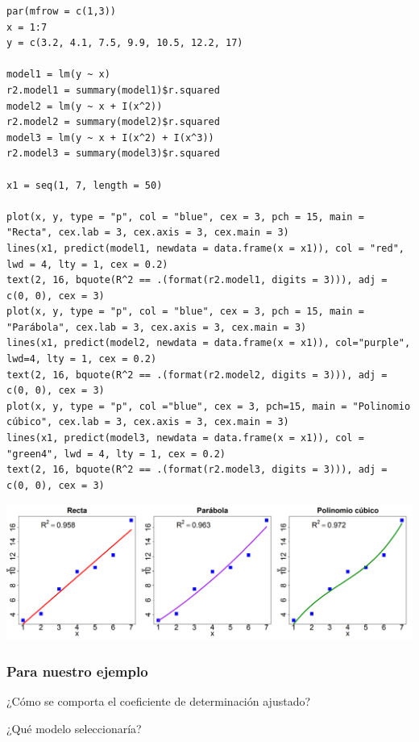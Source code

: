 \begin{lstlisting}
par(mfrow = c(1,3))
x = 1:7
y = c(3.2, 4.1, 7.5, 9.9, 10.5, 12.2, 17)

model1 = lm(y ~ x)
r2.model1 = summary(model1)$r.squared
model2 = lm(y ~ x + I(x^2))
r2.model2 = summary(model2)$r.squared
model3 = lm(y ~ x + I(x^2) + I(x^3))
r2.model3 = summary(model3)$r.squared

x1 = seq(1, 7, length = 50)

plot(x, y, type = "p", col = "blue", cex = 3, pch = 15, main = "Recta", cex.lab = 3, cex.axis = 3, cex.main = 3)
lines(x1, predict(model1, newdata = data.frame(x = x1)), col = "red", lwd = 4, lty = 1, cex = 0.2)
text(2, 16, bquote(R^2 == .(format(r2.model1, digits = 3))), adj = c(0, 0), cex = 3)
plot(x, y, type = "p", col = "blue", cex = 3, pch = 15, main = "Parábola", cex.lab = 3, cex.axis = 3, cex.main = 3)
lines(x1, predict(model2, newdata = data.frame(x = x1)), col="purple", lwd=4, lty = 1, cex = 0.2)
text(2, 16, bquote(R^2 == .(format(r2.model2, digits = 3))), adj = c(0, 0), cex = 3)
plot(x, y, type = "p", col ="blue", cex = 3, pch=15, main = "Polinomio cúbico", cex.lab = 3, cex.axis = 3, cex.main = 3)
lines(x1, predict(model3, newdata = data.frame(x = x1)), col = "green4", lwd = 4, lty = 1, cex = 0.2)
text(2, 16, bquote(R^2 == .(format(r2.model3, digits = 3))), adj = c(0, 0), cex = 3)
\end{lstlisting}

\begin{center}
	\includegraphics[width=\linewidth]{"Temas/Imágenes/Tema 2/000030"}
\end{center}
\subsubsection*{Para nuestro ejemplo}
¿Cómo se comporta el coeficiente de determinación ajustado?

¿Qué modelo seleccionaría?

